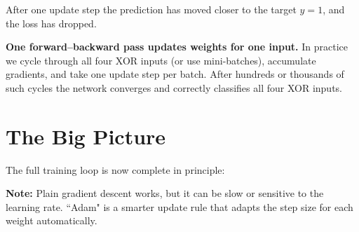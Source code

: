 \documentclass[12pt, a4paper]{article}
\begin{document}
After one update step the prediction has moved closer to the target $y = 1$,
and the loss has dropped.

\begin{warnbox}
  \textbf{One forward--backward pass updates weights for one input.}
  In practice we cycle through all four XOR inputs (or use mini-batches),
  accumulate gradients, and take one update step per batch.
  After hundreds or thousands of such cycles the network converges and
  correctly classifies all four XOR inputs.
\end{warnbox}

\section{The Big Picture}

The full training loop is now complete in principle:

\begin{center}
\end{center}

\vspace{0.5em}

\begin{notebox}
  \textbf{Note:} Plain gradient descent works, but it can be slow or sensitive to the
  learning rate. ``Adam" is a smarter update rule that adapts the step size for
  each weight automatically.
\end{notebox}
\end{document}
